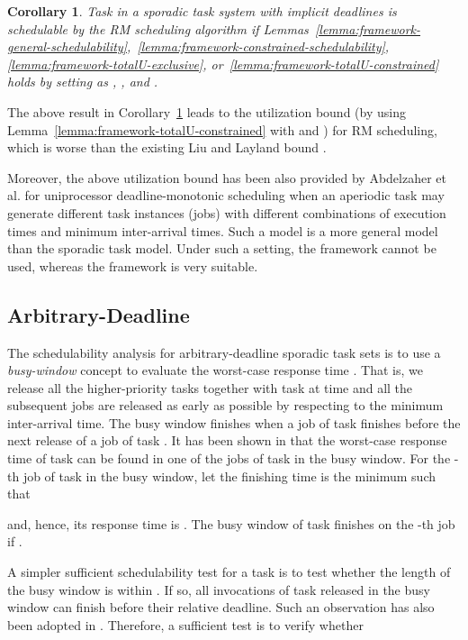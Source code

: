 \documentclass[10pt,conference]{IEEEtran}
\newcommand{\frameworkkq}[1]{}
\newcommand{\frameworkku}[1]{}
\newtheorem{corollary}{Corollary}
\begin{document}
\begin{corollary}
\label{corollary-rm}
Task  in a sporadic task system with implicit deadlines is
schedulable by the RM scheduling algorithm if
Lemmas~\ref{lemma:framework-general-schedulability},~\ref{lemma:framework-constrained-schedulability},
\ref{lemma:framework-totalU-exclusive},
or~\ref{lemma:framework-totalU-constrained} holds by setting
 as , , and .
\end{corollary}

The above result in Corollary~\ref{corollary-rm} leads to the
utilization bound  (by using
Lemma~\ref{lemma:framework-totalU-constrained} with  and
) for RM scheduling, which is worse than the existing
Liu and Layland bound  \cite{liu1973scheduling}. 

Moreover, the above utilization bound  has been also
provided by Abdelzaher et al. \cite{DBLP:journals/tc/AbdelzaherSL04}
for uniprocessor deadline-monotonic scheduling when an aperiodic task
may generate different task instances (jobs) with different
combinations of execution times and minimum inter-arrival times. Such
a model is a more general model than the sporadic task model. Under
such a setting, the \frameworkku{} framework cannot be used, whereas
the \frameworkkq{} framework is very suitable.

\subsection{Arbitrary-Deadline}
\label{sec:arbitrary-deadline}

The schedulability analysis for arbitrary-deadline sporadic task sets
is to use a \emph{busy-window} concept to evaluate the worst-case
response time \cite{DBLP:conf/rtss/Lehoczky90}. That is, we release
all the higher-priority tasks together with task  at time 
and all the subsequent jobs are released as early as possible by
respecting to the minimum inter-arrival time. The busy window finishes
when a job of task  finishes before the next release of a job
of task . It has been shown in
\cite{DBLP:conf/rtss/Lehoczky90} that the worst-case response time of
task  can be found in one of the jobs of task  in the
busy window.
For the -th job of task  in the busy window, let  the finishing
time  is the minimum  such that
 
and, hence, its response time is . The busy window
of task  finishes on the -th job if . 

A simpler sufficient schedulability test for a task  is to
test whether the length of the busy window is within .  If so,
all invocations of task  released in the busy window can
finish before their relative deadline. Such an observation has also
been adopted in \cite{conf:/rtns09/Davis}. Therefore, a sufficient
test is to verify whether
\end{document}
